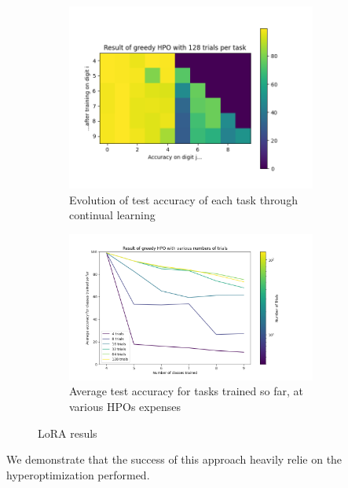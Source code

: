 \documentclass{article}
\begin{document}
\begin{figure}[htbp]
    \centering
    \begin{subfigure}[b]{0.45\textwidth}
        \centering
        \includegraphics[width=0.9\textwidth]{imgs/ICL5_128_trial_greedy_HPO_matrix_LoRA.png}
        \caption{Evolution of test accuracy of each task through continual learning}
        \label{fig:ICL5_127}
    \end{subfigure}
    \hspace{2.0mm}
    \begin{subfigure}[b]{0.45\textwidth}
        \centering
        \includegraphics[width=0.9\textwidth]{imgs/ICL5_greedy_HPO_curve_LoRA.png}
        \caption{Average test accuracy for tasks trained so far, at various HPOs expenses}
        \label{fig:ICL5_128}
    \end{subfigure}
    \caption{LoRA resuls}
    \label{fig:LoRA_results}
\end{figure}

We demonstrate that the success of this approach heavily relie on the hyperoptimization performed. 
\end{document}
